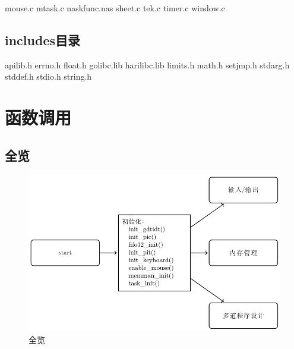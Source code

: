 mouse.c                                                                                                                                            
mtask.c                                                                                                                                            
naskfunc.nas                                                                                                                                       
sheet.c                                                                                                                                            
tek.c                                                                                                                                              
timer.c                                                                                                                                            
window.c

\section{includes目录}
apilib.h
errno.h
float.h
golibc.lib
harilibc.lib
limits.h
math.h
setjmp.h
stdarg.h
stddef.h
stdio.h
string.h

\chapter{函数调用} 

\section{全览}

\begin{figure}[H]
    \centering
    \includegraphics[width=.8\textwidth]{fig/func/run.pdf}
    \caption{全览}
    \label{fig:run}
  \end{figure}

